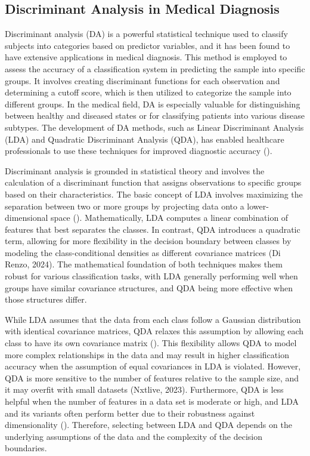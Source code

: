 \documentclass[12pt]{article}
\begin{document}
\subsection{Discriminant Analysis in Medical Diagnosis}
\noindent

Discriminant analysis (DA) is a powerful statistical technique used to classify subjects into categories based on predictor variables, and it has been found to have extensive applications in medical diagnosis. This method is employed to assess the accuracy of a classification system in predicting the sample into specific groups. It involves creating discriminant functions for each observation and determining a cutoff score, 
which is then utilized to categorize the sample into different groups. In the medical field, DA is especially valuable for distinguishing between healthy and diseased states or for classifying patients into various disease subtypes. The development of DA methods, such as Linear Discriminant Analysis (LDA) and Quadratic Discriminant Analysis (QDA), has enabled healthcare professionals to use these techniques for improved diagnostic accuracy (\cite{Dhamnetiya2022}). 

Discriminant analysis is grounded in statistical theory and involves the calculation of a discriminant function that assigns observations to specific groups based on their characteristics. The basic concept of LDA involves maximizing the separation between two or more groups by projecting data onto a lower-dimensional space (\cite{GeeksforGeeksLDA}). 
Mathematically, LDA computes a linear combination of features that best separates the classes. In contrast, QDA introduces a quadratic term, allowing for more flexibility in the decision boundary between classes by modeling the class-conditional densities as different covariance matrices (Di Renzo, 2024). The mathematical foundation of both techniques makes them robust for various classification tasks, with LDA generally performing well when groups have similar covariance structures, and QDA being more effective when those structures differ.

While LDA assumes that the data from each class follow a Gaussian distribution with identical covariance matrices, QDA relaxes this assumption by allowing each class to have its own covariance matrix (\cite{ScikitLearnLDAQDA}).
This flexibility allows QDA to model more complex relationships in the data and may result in higher classification accuracy when the assumption of equal covariances in LDA is violated. However, QDA is more sensitive to the number of features relative to the sample size, and it may overfit with small datasets (Nxtlive, 2023). 
Furthermore, QDA is less helpful when the number of features in a data set is moderate or high, and LDA and its variants often perform better due to their robustness against dimensionality (\cite{Wu2022}). Therefore, selecting between LDA and QDA depends on the underlying assumptions of the data and the complexity of the decision boundaries.
\end{document}
